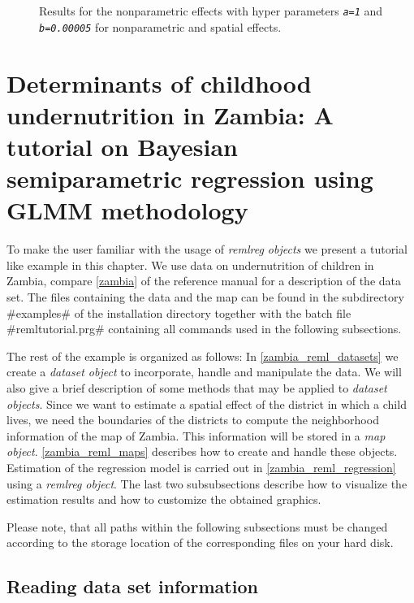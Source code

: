 \documentclass[11pt,a4paper,twoside]{bayesxreport}
\begin{document}
\begin{figure}[ht]
\begin{center}
{\it\caption{Results for the nonparametric effects with hyper
parameters {\em\tt a=1} and {\em\tt b=0.00005} for nonparametric and
spatial effects.\label{zambia_mcmc_sensi3}}}
\end{center}
\end{figure}

\chapter[A tutorial
on Bayesian semiparametric regression using GLMM
methodology]{Determinants of childhood undernutrition in Zambia: A
tutorial on Bayesian semiparametric regression using GLMM
methodology} \label{remlregzambiaanalysis}

To make the user familiar with the usage of {\em remlreg objects} we
present a tutorial like example in this chapter. We use data on
undernutrition of children in Zambia, compare \autoref{zambia} of
the reference manual for a description of the data set. The files
containing the data and the map can be found in the subdirectory
#examples# of the installation directory together with the batch
file #remltutorial.prg# containing all commands used in the
following subsections.

The rest of the example is organized as follows: In
\autoref{zambia_reml_datasets} we create a {\em dataset object} to
incorporate, handle and manipulate the data. We will also give a
brief description of some methods that may be applied to {\em
dataset objects}. Since we want to estimate a spatial effect of the
district in which a child lives, we need the boundaries of the
districts to compute the neighborhood information of the map of
Zambia. This information will be stored in a {\em map object}.
\autoref{zambia_reml_maps} describes how to create and handle these
objects. Estimation of the regression model is carried out in
\autoref{zambia_reml_regression} using a {\em remlreg object}. The
last two subsubsections describe how to visualize the estimation
results and how to customize the obtained graphics.

Please note, that all paths within the following subsections must be
changed according to the storage location of the corresponding files
on your hard disk.

\section{Reading data set information}\label{zambia_reml_datasets}
\end{document}
